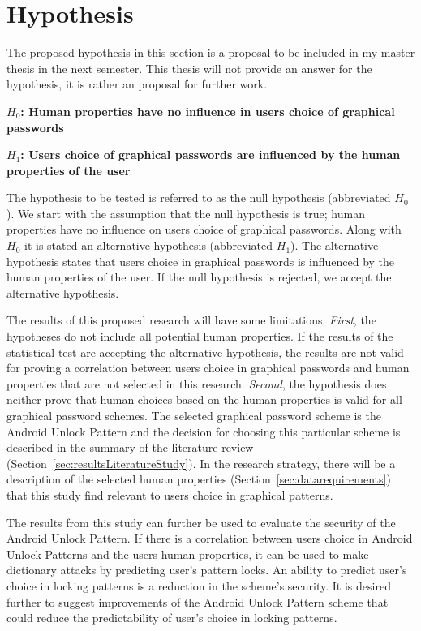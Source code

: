 \section{Hypothesis} \label{sec:hypothesis}

  The proposed hypothesis in this section is a proposal to be included in my master thesis in the next semester. This thesis will not provide an answer for the hypothesis, it is rather an proposal for further work. 
    
  {\bf $H_{0}$: Human properties have no influence in users choice of graphical passwords} 

  {\bf $H_{1}$: Users choice of graphical passwords are influenced by the human properties of the user}

  The hypothesis to be tested is referred to as the null hypothesis (abbreviated $H_{0}$). We start with the assumption that the null hypothesis is true; human properties have no influence on users choice of graphical passwords. Along with $H_{0}$ it is stated an alternative hypothesis (abbreviated $H_{1}$). The alternative hypothesis states that users choice in graphical passwords is influenced by the human properties of the user. If the null hypothesis is rejected, we accept the alternative hypothesis.

  The results of this proposed research will have some limitations. {\it First}, the hypotheses do not include all potential human properties. If the results of the statistical test are accepting the alternative hypothesis, the results are not valid for proving a correlation between users choice in graphical passwords and human properties that are not selected in this research. 
  {\it Second}, the hypothesis does neither prove that human choices based on the human properties is valid for all graphical password schemes. The selected graphical password scheme is the Android Unlock Pattern and the decision for choosing this particular scheme is described in the summary of the literature review (Section~\ref{sec:resultsLiteratureStudy}). 
  In the research strategy, there will be a description of the selected human properties (Section~\ref{sec:datarequirements}) that this study find relevant to users choice in graphical patterns.
  
  The results from this study can further be used to evaluate the security of the Android Unlock Pattern. If there is a correlation between users choice in Android Unlock Patterns and the users human properties, it can be used to make dictionary attacks by predicting user's pattern locks. An ability to predict user's choice in locking patterns is a reduction in the scheme's security. It is desired further to suggest improvements of the Android Unlock Pattern scheme that could reduce the predictability of user's choice in locking patterns.

